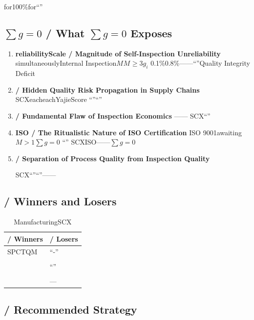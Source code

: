 \documentclass[12pt,a4paper]{article}
\theoremstyle{remark}
\newcommand{\sumgeq}{\sum g = 0}
\begin{document}
for100\%for``''
\textbf{}

\subsection{$\sumgeq$ / What $\sumgeq$ Exposes}

\begin{enumerate}[leftmargin=*, label=\textbf{(\arabic*)}]
    \item \textbf{reliabilityScale / Magnitude of Self-Inspection Unreliability}
    simultaneouslyInternal Inspection$M_{\text{}}$$M_{\text{}} \geq 3$$g_i$
    0.1\%0.8\%——``''Quality Integrity Deficit

    \item \textbf{ / Hidden Quality Risk Propagation in Supply Chains}
    SCXeacheachYajieScore
    ``''``''

    \item \textbf{ / Fundamental Flaw of Inspection Economics}
    ——
    SCX``''

    \item \textbf{ISO / The Ritualistic Nature of ISO Certification}
    ISO 9001awaiting$M>1$$\sumgeq$
    ``''
    SCXISO——$\sumgeq$

    \item \textbf{ / Separation of Process Quality from Inspection Quality}
    
    SCX``''``''——
\end{enumerate}

\subsection{ / Winners and Losers}

\begin{table}[H]
\centering
\caption{ManufacturingSCX}
\label{tab:mfg_wl}
\begin{tabular}{@{}p{7cm}p{7cm}@{}}
\toprule
\textbf{ / Winners} & \textbf{ / Losers} \\
\midrule
SPCTQM & ``-'' \\
\addlinespace
 &  \\
\addlinespace
 & ``'' \\
\addlinespace
 &  \\
\addlinespace
 & — \\
\bottomrule
\end{tabular}
\end{table}

\subsection{ / Recommended Strategy}
\end{document}
